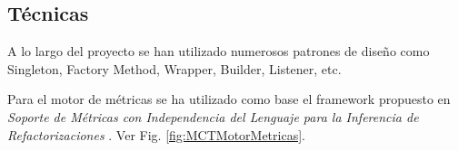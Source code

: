 \subsection{Técnicas}
A lo largo del proyecto se han utilizado numerosos patrones de diseño \cite{gamma_patrones_2002} como Singleton, Factory Method, Wrapper, Builder, Listener, etc.

Para el motor de métricas se ha utilizado como base el framework propuesto en \textit{Soporte de Métricas con Independencia del Lenguaje para la Inferencia de Refactorizaciones} \cite{marticorena_soporte_2005}. Ver Fig. \ref{fig:MCTMotorMetricas}.
